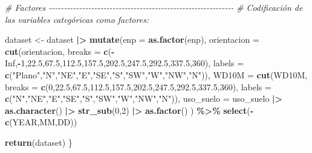 \documentclass[12pt,a4paper,]{book}
\newenvironment{Shaded}{\begin{snugshade}}{\end{snugshade}}
\newcommand{\AttributeTok}[1]{\textcolor[rgb]{0.13,0.29,0.53}{#1}}
\newcommand{\CommentTok}[1]{\textcolor[rgb]{0.56,0.35,0.01}{\textit{#1}}}
\newcommand{\ConstantTok}[1]{\textcolor[rgb]{0.56,0.35,0.01}{#1}}
\newcommand{\DecValTok}[1]{\textcolor[rgb]{0.00,0.00,0.81}{#1}}
\newcommand{\FloatTok}[1]{\textcolor[rgb]{0.00,0.00,0.81}{#1}}
\newcommand{\FunctionTok}[1]{\textcolor[rgb]{0.13,0.29,0.53}{\textbf{#1}}}
\newcommand{\NormalTok}[1]{#1}
\newcommand{\OtherTok}[1]{\textcolor[rgb]{0.56,0.35,0.01}{#1}}
\newcommand{\SpecialCharTok}[1]{\textcolor[rgb]{0.81,0.36,0.00}{\textbf{#1}}}
\newcommand{\StringTok}[1]{\textcolor[rgb]{0.31,0.60,0.02}{#1}}
\numberwithin{dummy}{section}
\theoremstyle{ocrenumbox}
\theoremstyle{blacknumex}
\theoremstyle{blacknumbox}
\theoremstyle{ocrenum}
\theoremstyle{ocrenum}
\begin{document}
\begin{Shaded}
\begin{Highlighting}[]
  
  \CommentTok{\# Factores {-}{-}{-}{-}{-}{-}{-}{-}{-}{-}{-}{-}{-}{-}{-}{-}{-}{-}{-}{-}{-}{-}{-}{-}{-}{-}{-}{-}{-}{-}{-}{-}{-}{-}{-}{-}{-}{-}{-}{-}{-}{-}{-}{-}{-}{-}{-}{-}{-}{-}{-}{-}{-}{-}{-}{-}{-}{-}{-}{-}{-}}
  \CommentTok{\# Codificación de las variables categóricas como factores:}
  
\NormalTok{  dataset }\OtherTok{\textless{}{-}}\NormalTok{ dataset }\SpecialCharTok{|\textgreater{}} 
    \FunctionTok{mutate}\NormalTok{(}\AttributeTok{enp =} \FunctionTok{as.factor}\NormalTok{(enp),}
           \AttributeTok{orientacion =} \FunctionTok{cut}\NormalTok{(orientacion,}
                             \AttributeTok{breaks =} \FunctionTok{c}\NormalTok{(}\SpecialCharTok{{-}}\ConstantTok{Inf}\NormalTok{,}\SpecialCharTok{{-}}\DecValTok{1}\NormalTok{,}\FloatTok{22.5}\NormalTok{,}\FloatTok{67.5}\NormalTok{,}\FloatTok{112.5}\NormalTok{,}\FloatTok{157.5}\NormalTok{,}\FloatTok{202.5}\NormalTok{,}\FloatTok{247.5}\NormalTok{,}\FloatTok{292.5}\NormalTok{,}\FloatTok{337.5}\NormalTok{,}\DecValTok{360}\NormalTok{),}
                             \AttributeTok{labels =} \FunctionTok{c}\NormalTok{(}\StringTok{"Plano"}\NormalTok{,}\StringTok{"N"}\NormalTok{,}\StringTok{"NE"}\NormalTok{,}\StringTok{"E"}\NormalTok{,}\StringTok{"SE"}\NormalTok{,}\StringTok{"S"}\NormalTok{,}\StringTok{"SW"}\NormalTok{,}\StringTok{"W"}\NormalTok{,}\StringTok{"NW"}\NormalTok{,}\StringTok{"N"}\NormalTok{)),}
           \AttributeTok{WD10M =} \FunctionTok{cut}\NormalTok{(WD10M,}
                       \AttributeTok{breaks =} \FunctionTok{c}\NormalTok{(}\DecValTok{0}\NormalTok{,}\FloatTok{22.5}\NormalTok{,}\FloatTok{67.5}\NormalTok{,}\FloatTok{112.5}\NormalTok{,}\FloatTok{157.5}\NormalTok{,}\FloatTok{202.5}\NormalTok{,}\FloatTok{247.5}\NormalTok{,}\FloatTok{292.5}\NormalTok{,}\FloatTok{337.5}\NormalTok{,}\DecValTok{360}\NormalTok{),}
                       \AttributeTok{labels =} \FunctionTok{c}\NormalTok{(}\StringTok{"N"}\NormalTok{,}\StringTok{"NE"}\NormalTok{,}\StringTok{"E"}\NormalTok{,}\StringTok{"SE"}\NormalTok{,}\StringTok{"S"}\NormalTok{,}\StringTok{"SW"}\NormalTok{,}\StringTok{"W"}\NormalTok{,}\StringTok{"NW"}\NormalTok{,}\StringTok{"N"}\NormalTok{)),}
           \AttributeTok{uso\_suelo =}\NormalTok{ uso\_suelo }\SpecialCharTok{|\textgreater{}} \FunctionTok{as.character}\NormalTok{() }\SpecialCharTok{|\textgreater{}} \FunctionTok{str\_sub}\NormalTok{(}\DecValTok{0}\NormalTok{,}\DecValTok{2}\NormalTok{) }\SpecialCharTok{|\textgreater{}} \FunctionTok{as.factor}\NormalTok{()}
\NormalTok{           ) }\SpecialCharTok{\%\textgreater{}\%} 
    \FunctionTok{select}\NormalTok{(}\SpecialCharTok{{-}}\FunctionTok{c}\NormalTok{(YEAR,MM,DD))}
  
  \FunctionTok{return}\NormalTok{(dataset)}
\NormalTok{\}}
\end{Highlighting}
\end{Shaded}
\end{document}
